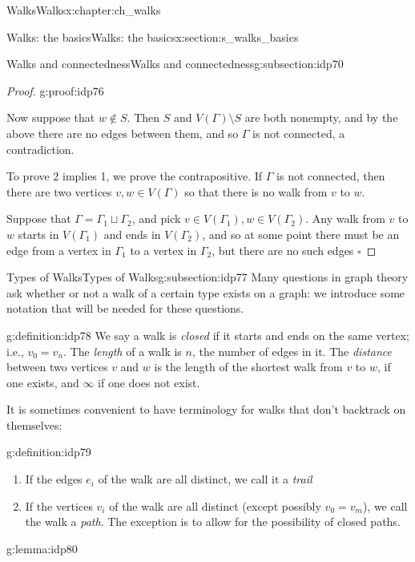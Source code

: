 \documentclass[oneside,10pt,]{book}
\numberwithin{equation}{section}
\begin{document}
\begin{chapterptx}{Walks}{}{Walks}{}{}{x:chapter:ch_walks}
\begin{sectionptx}{Walks: the basics}{}{Walks: the basics}{}{}{x:section:s_walks_basics}
\begin{subsectionptx}{Walks and connectedness}{}{Walks and connectedness}{}{}{g:subsection:idp70}
\begin{proof}{}{g:proof:idp76}
\par
Now suppose that \(w\notin S\).  Then \(S\) and \(V(\Gamma)\setminus S\) are both nonempty, and by the above there are no edges between them, and so \(\Gamma\) is not connected, a contradiction.%
\par
To prove 2 implies 1, we prove the contrapositive.  If \(\Gamma\) is not connected, then there are two vertices \(v,w\in V(\Gamma)\) so that there is no walk from \(v\) to \(w\).%
\par
Suppose that \(\Gamma=\Gamma_1\sqcup\Gamma_2\), and pick \(v\in V(\Gamma_1), w\in V(\Gamma_2)\).  Any walk from \(v\) to \(w\) starts in \(V(\Gamma_1)\) and ends in \(V(\Gamma_2)\), and so at some point there must be an edge from a vertex in \(\Gamma_1\) to a vertex in \(\Gamma_2\), but there are no such edges \(\square\)%
\end{proof}
\end{subsectionptx}
%
%
\typeout{************************************************}
\typeout{************************************************}
%
\begin{subsectionptx}{Types of Walks}{}{Types of Walks}{}{}{g:subsection:idp77}
Many questions in graph theory ask whether or not a walk of a certain type exists on a graph: we introduce some notation that will be needed for these questions.%
\begin{definition}{}{g:definition:idp78}%
We say a walk is \emph{closed} if it starts and ends on the same vertex; i.e., \(v_0=v_n\).  The \emph{length} of a walk is \(n\), the number of edges in it.  The \emph{distance} between two vertices \(v\) and \(w\) is the length of the shortest walk from \(v\) to \(w\), if one exists, and \(\infty\) if one does not exist.%
\end{definition}
It is sometimes convenient to have terminology for walks that don't backtrack on themselves:%
\begin{definition}{}{g:definition:idp79}%
%
\begin{enumerate}
\item{}If the edges \(e_i\) of the walk are all distinct, we call it a \emph{trail}%
\item{}If the vertices \(v_i\) of the walk are all distinct (except possibly \(v_0=v_m\)), we call the walk a \emph{path}.  The exception is to allow for the possibility of closed paths.%
\end{enumerate}
\end{definition}
\begin{lemma}{}{}{g:lemma:idp80}%

\end{lemma}
\end{subsectionptx}
\end{sectionptx}
\end{chapterptx}
\end{document}
